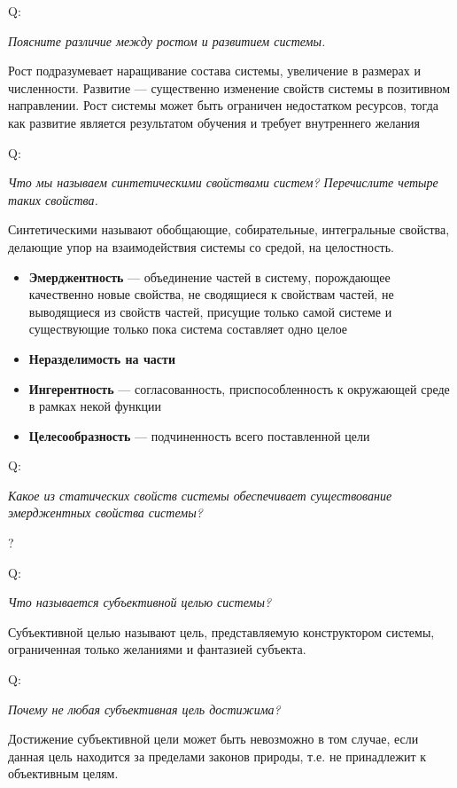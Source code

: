 \documentclass{article}
\newcommand{\important}[1]{\textbf{#1}}
\newcommand{\define}[2]{
	\textbf{#1} --- #2
	}
\newcommand{\question}[2]{
	\begin{flushright}
		Q:\hspace{2ex}\vline\hspace{2ex}
		\begin{minipage}{0.9\textwidth}
			\large
			\textit{#1}
		\end{minipage}
	\end{flushright}
	\begin{center}
		\begin{minipage}{0.95\textwidth}
			#2
		\end{minipage}
	\end{center}
	}
\begin{document}
\question{Поясните различие между ростом и развитием системы.}{Рост подразумевает наращивание состава системы, увеличение в размерах и численности. Развитие --- существенно изменение свойств системы в позитивном направлении. Рост системы может быть ограничен недостатком ресурсов, тогда как развитие является результатом обучения и требует внутреннего желания}
\question{Что мы называем синтетическими свойствами систем? Перечислите четыре таких свойства.}{Синтетическими называют обобщающие, собирательные, интегральные свойства, делающие упор на взаимодействия системы со средой, на целостность.
	\begin{itemize}
		\item \define{Эмерджентность}{объединение частей в систему, порождающее качественно новые свойства, не сводящиеся к свойствам частей, не выводящиеся из свойств частей, присущие только самой системе и существующие только пока система составляет одно целое}
		\item \important{Неразделимость на части}
		\item \define{Ингерентность}{согласованность, приспособленность к окружающей среде в рамках некой функции}
		\item \define{Целесообразность}{подчиненность всего поставленной цели}
	\end{itemize}}
\question{Какое из статических свойств системы обеспечивает существование эмерджентных свойства системы?}{?}
\question{Что называется субъективной целью системы?}{Субъективной целью называют цель, представляемую конструктором системы, ограниченная только желаниями и фантазией субъекта.}
\question{Почему не любая субъективная цель достижима?}{Достижение субъективной цели может быть невозможно в том случае, если данная цель находится за пределами законов природы, т.е. не принадлежит к объективным целям.}
\end{document}
